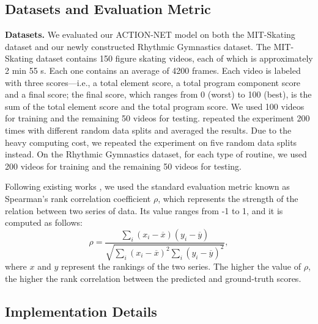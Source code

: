 \documentclass[sigconf]{acmart}
\begin{document}
\vspace{-0.1cm}

\subsection{Datasets and Evaluation Metric}

\textbf{Datasets.} We evaluated our ACTION-NET model on both the MIT-Skating dataset \cite{pirsiavash2014assessing} and our newly constructed Rhythmic Gymnastics dataset. The MIT-Skating dataset contains 150 figure skating videos, each of which is approximately 2 min 55 s. Each one contains an average of 4200 frames. Each video is labeled with three scores---i.e., a total element score, a total program component score and a final score; the final score, which ranges from 0 (worst) to 100 (best), is the sum of the total element score and the total program score. We used 100 videos for training and the remaining 50 videos for testing. \cite{parmar2016measuring,parmar2017learning} repeated the experiment 200 times with different random data splits and averaged the results. Due to the heavy computing cost, we repeated the experiment on five random data splits instead. On the Rhythmic Gymnastics dataset, for each type of routine, we used 200 videos for training and the remaining 50 videos for testing.

\vspace{5pt}

Following existing works \cite{pirsiavash2014assessing,li2018end,xu2019learning}, we used the standard evaluation metric known as Spearman's rank correlation coefficient $\rho$, which represents the strength of the relation between two series of data. Its value ranges from -1 to 1, and it is computed as follows:
\begin{equation}
\rho = \frac 
{\sum _{i} {(x_i - \overline{x}) (y_i - \overline{y}) }} 
{\sqrt{ \sum _{i} {(x_i - \overline{x})^2}     \sum _{i} {(y_i - \overline{y})^2} }},
\end{equation}
where $x$ and $y$ represent the rankings of the two series. The higher the value of $\rho$, the higher the rank correlation between the predicted and ground-truth scores.

\vspace{-0.1cm}
\subsection{Implementation Details}
\end{document}
